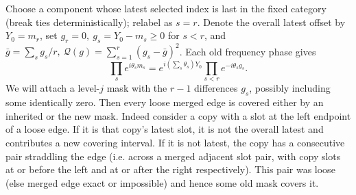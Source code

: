 \documentclass[11pt]{article}
\begin{document}
Choose a component whose latest selected index is last in the fixed category (break ties deterministically); relabel as \(s=r\). Denote the overall latest offset by \(Y_0=m_r\), set \(g_r=0,\ g_s=Y_0-m_s\ge0\) for \(s<r\), and \(\bar g=\sum_s g_s/r,\ \mathcal{Q}(g)=\sum_{s=1}^r(g_s-\bar g)^2\). Each old frequency phase gives
\[
 \prod_s e^{i\theta_s m_s}=e^{i(\sum_s\theta_s)Y_0}\prod_{s<r}e^{-i\theta_s g_s}.
\]
We will attach a level-\(j\) mask with the \(r-1\) differences \(g_s\), possibly including some identically zero. Then every loose merged edge is covered either by an inherited or the new mask. Indeed consider a copy with a slot at the left endpoint of a loose edge. If it is that copy's latest slot, it is not the overall latest and contributes a new covering interval. If it is not latest, the copy has a consecutive pair straddling the edge (i.e. across a merged adjacent slot pair, with copy slots at or before the left and at or after the right respectively). This pair was loose (else merged edge exact or impossible) and hence some old mask covers it.
\end{document}
